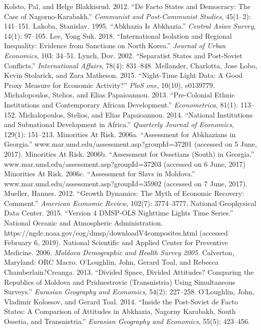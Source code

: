 \documentclass[12pt,a4paper]{article}%
\begin{document}
\begin{thebibliography}{99}
\bibitem{} Kolsto, Pal, and Helge Blakkisrud. 2012. ``De Facto States and Democracy: The Case of Nagorno-Karabakh.'' \textit{Communist and Post-Communist Studies}, 45(1--2): 141--151.
\bibitem{} Lakoba, Stanislav. 1995. ``Abkhazia Is Abkhazia.'' \textit{Central Asian Survey}, 14(1): 97--105.
\bibitem{} Lee, Yong Suk. 2018. ``International Isolation and Regional Inequality: Evidence from Sanctions on North Korea.'' \textit{Journal of Urban Economics}, 103: 34--51.
\bibitem{} Lynch, Dov. 2002. ``Separatist States and Post-Soviet Conflicts.'' \textit{International Affairs}, 78(4): 831--848.
\bibitem{} Mellander, Charlotta, Jose Lobo, Kevin Stolarick, and Zara Matheson. 2015. ``Night-Time Light Data: A Good Proxy Measure for Economic Activity?'' \textit{PloS one}, 10(10), e0139779.
\bibitem{} Michalopoulos, Stelios, and Elias Papaioannou. 2013. ``Pre-Colonial Ethnic Institutions and Contemporary African Development.'' \textit{Econometrica}, 81(1): 113--152.
\bibitem{} Michalopoulos, Stelios, and Elias Papaioannou. 2014. ``National Institutions and Subnational Development in Africa.'' \textit{Quarterly Journal of Economics}, 129(1): 151--213.
\bibitem{} Minorities At Risk. 2006a. ``Assessment for Abkhazians in Georgia.'' www.mar.umd.edu/assessment.asp?groupId=37201 (accessed on 5 June, 2017).
\bibitem{} Minorities At Risk. 2006b. ``Assessment for Ossetians (South) in Georgia.'' www.mar.umd.edu/assessment.asp?groupId=37203  (accessed on 6 June, 2017)
\bibitem{} Minorities At Risk. 2006c. ``Assessment for Slavs in Moldova.'' www.mar.umd.edu/assessment.asp?groupId=35902 (accessed on 7 June, 2017).
\bibitem{} Mueller, Hannes. 2012. ``Growth Dynamics: The Myth of Economic Recovery: Comment.'' \textit{American Economic Review}, 102(7): 3774--3777.
\bibitem{} National Geophysical Data Center. 2015. ``Version 4 DMSP-OLS Nighttime Lights Time Series.'' National Oceanic and Atmospheric Administration. https://ngdc.noaa.gov/eog/dmsp/downloadV4composites.html (accessed February 6, 2019).
\bibitem{} National Scientific and Applied Center for Preventive Medicine. 2006. \textit{Moldova Demographic and Health Survey 2005}. Calverton, Maryland: ORC Macro.
\bibitem{} O'Loughlin, John, Gerard Toal, and Rebecca Chamberlain?Creanga. 2013. ``Divided Space, Divided Attitudes? Comparing the Republics of Moldova and Pridnestrovie (Transnistria) Using Simultaneous Surveys.'' \textit{Eurasian Geography and Economics}, 54(2): 227--258.
\bibitem{} O'Loughlin, John, Vladimir Kolossov, and Gerard Toal. 2014. ``Inside the Post-Soviet de Facto States: A Comparison of Attitudes in Abkhazia, Nagorny Karabakh, South Ossetia, and Transnistria.'' \textit{Eurasian Geography and Economics}, 55(5): 423--456.

\end{thebibliography}
\end{document}
